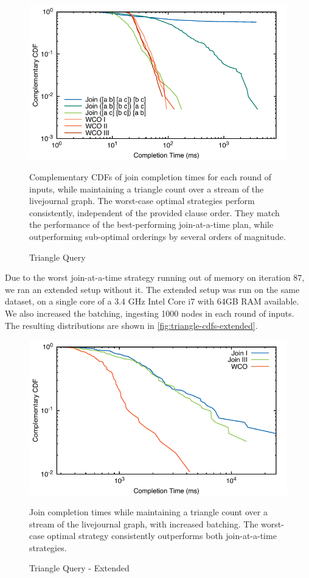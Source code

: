 \documentclass[../catalog.tex]{subfiles}
\begin{document}
\begin{figure}[h!]
  \includegraphics[width=1.0\linewidth]{results/triangles/out/all_cdfs}
  \caption{Triangle Query}
  \label{fig:triangle-cdfs}
  \medskip
  \small

  Complementary CDFs of join completion times for each round of
  inputs, while maintaining a triangle count over a stream of the
  livejournal graph. The worst-case optimal strategies perform
  consistently, independent of the provided clause order. They match
  the performance of the best-performing join-at-a-time plan, while
  outperforming sub-optimal orderings by several orders of magnitude.
\end{figure}

Due to the worst join-at-a-time strategy running out of memory on
iteration 87, we ran an extended setup without it. The extended setup
was run on the same dataset, on a single core of a 3.4 GHz Intel Core
i7 with 64GB RAM available. We also increased the batching, ingesting
1000 nodes in each round of inputs. The resulting distributions are
shown in \autoref{fig:triangle-cdfs-extended}.

\begin{figure}[h!]
  \includegraphics[width=1.0\linewidth]{results/triangles/out/batch_cdf}
  \caption{Triangle Query - Extended}
  \label{fig:triangle-cdfs-extended}

  Join completion times while maintaining a triangle count over a
  stream of the livejournal graph, with increased batching. The
  worst-case optimal strategy consistently outperforms both
  join-at-a-time strategies.
\end{figure}
\end{document}

